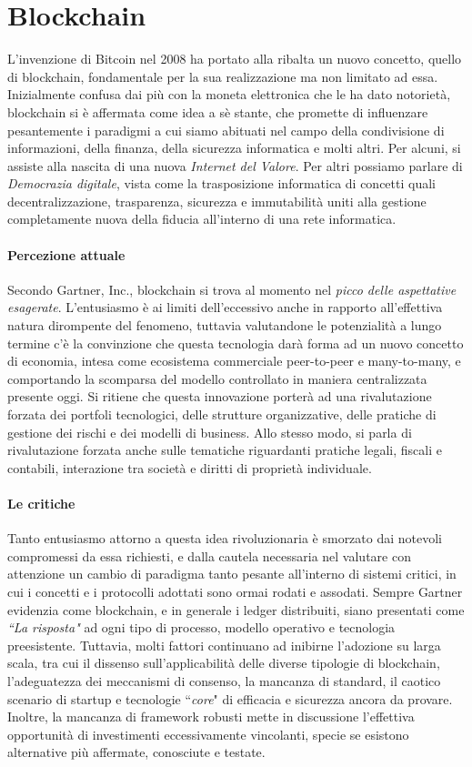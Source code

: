 \section{Blockchain}\label{sec:introduzione}
	L'invenzione di Bitcoin nel 2008 ha portato alla ribalta un nuovo concetto, quello di blockchain, fondamentale per la sua realizzazione ma non limitato ad essa. Inizialmente confusa dai più con la moneta elettronica che le ha dato notorietà,  blockchain si è affermata come idea a sè stante, che promette di influenzare pesantemente i paradigmi a cui siamo abituati nel campo della condivisione di informazioni, della finanza, della sicurezza informatica e molti altri. Per alcuni, si assiste alla nascita di una nuova \emph{Internet del Valore}. Per altri possiamo parlare di \emph{Democrazia digitale}, vista come la trasposizione informatica di concetti quali decentralizzazione, trasparenza, sicurezza e immutabilità uniti alla gestione completamente nuova della fiducia all'interno di una rete informatica.
	\paragraph{Percezione attuale} Secondo Gartner, Inc.\cite{gartner}, blockchain si trova al momento nel \emph{picco delle aspettative esagerate}. L'entusiasmo è ai limiti dell'eccessivo anche in rapporto all'effettiva natura dirompente del fenomeno, tuttavia valutandone le potenzialità a lungo termine c'è la convinzione che questa tecnologia darà forma ad un nuovo concetto di economia, intesa come ecosistema commerciale peer-to-peer e many-to-many, e comportando la scomparsa del modello controllato in maniera centralizzata presente oggi. Si ritiene che questa innovazione porterà ad una rivalutazione forzata dei portfoli tecnologici, delle strutture organizzative, delle pratiche di gestione dei rischi e dei modelli di business. Allo stesso modo, si parla di rivalutazione forzata anche sulle tematiche riguardanti pratiche legali, fiscali e contabili, interazione tra società e diritti di proprietà individuale.
	\paragraph{Le critiche} Tanto entusiasmo attorno a questa idea rivoluzionaria è smorzato dai notevoli compromessi da essa richiesti, e dalla cautela necessaria nel valutare con attenzione un cambio di paradigma tanto pesante all'interno di sistemi critici, in cui i concetti e i protocolli adottati sono ormai rodati e assodati. Sempre Gartner evidenzia come blockchain, e in generale i ledger distribuiti, siano presentati come \emph{``La risposta"} ad ogni tipo di processo, modello operativo e tecnologia preesistente. Tuttavia, molti fattori continuano ad inibirne l'adozione su larga scala, tra cui il dissenso sull'applicabilità delle diverse tipologie di blockchain, l'adeguatezza dei meccanismi di consenso, la mancanza di standard, il caotico scenario di startup e tecnologie ``\emph{core}" di efficacia e sicurezza ancora da provare. Inoltre, la mancanza di framework robusti mette in discussione l'effettiva opportunità di investimenti eccessivamente vincolanti, specie se esistono alternative più affermate, conosciute e testate.

